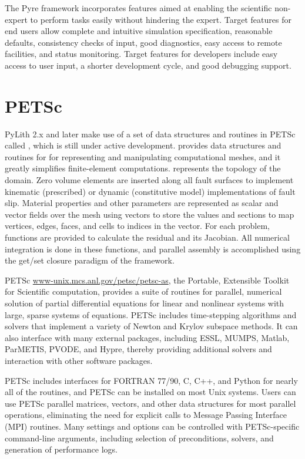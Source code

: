 The Pyre framework incorporates features aimed at enabling the
scientific non-expert to perform tasks easily without hindering the
expert. Target features for end users allow complete and intuitive
simulation specification, reasonable defaults, consistency checks of
input, good diagnostics, easy access to remote facilities, and status
monitoring. Target features for developers include easy access to user
input, a shorter development cycle, and good debugging support.


\section{PETSc}

PyLith 2.x and later make use of a set of data structures and routines
in PETSc called , which is still under active
development.  provides data structures and routines for
for representing and manipulating computational meshes, and it greatly
simplifies finite-element computations. represents the
topology of the domain. Zero volume elements are inserted along all
fault surfaces to implement kinematic (prescribed) or dynamic
(constitutive model) implementations of fault slip. Material
properties and other parameters are represented as scalar and vector
fields over the mesh using vectors to store the values and sections to
map vertices, edges, faces, and cells to indices in the vector. For
each problem, functions are provided to calculate the residual and its
Jacobian.  All numerical integration is done in these functions, and
parallel assembly is accomplished using the get/set closure paradigm
of the  framework.

PETSc \url{www-unix.mcs.anl.gov/petsc/petsc-as}, the Portable,
Extensible Toolkit for Scientific computation, provides a suite of
routines for parallel, numerical solution of partial differential
equations for linear and nonlinear systems with large, sparse systems
of equations.  PETSc includes time-stepping algorithms and solvers
that implement a variety of Newton and Krylov subspace methods. It can
also interface with many external packages, including ESSL, MUMPS,
Matlab, ParMETIS, PVODE, and Hypre, thereby providing additional
solvers and interaction with other software packages.

PETSc includes interfaces for FORTRAN 77/90, C, C++, and Python for
nearly all of the routines, and PETSc can be installed on most Unix
systems. Users can use PETSc parallel matrices, vectors, and other
data structures for most parallel operations, eliminating the need for
explicit calls to Message Passing Interface (MPI) routines. Many
settings and options can be controlled with PETSc-specific
command-line arguments, including selection of preconditions, solvers,
and generation of performance logs.


